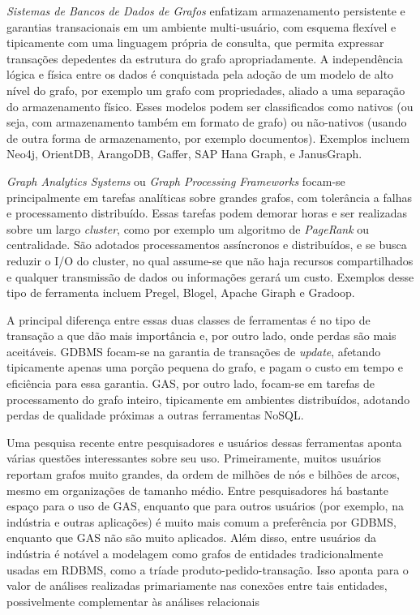 \documentclass[conference]{IEEEtran}
\begin{document}
\emph{Sistemas de Bancos de Dados de Grafos} enfatizam armazenamento
persistente e garantias transacionais em um ambiente multi-usuário, com esquema
flexível e tipicamente com uma linguagem própria de consulta, que permita
expressar transações depedentes da estrutura do grafo apropriadamente. A
independência lógica e física entre os dados é conquistada pela adoção de um
modelo de alto nível do grafo, por exemplo um grafo com propriedades, aliado a
uma separação do armazenamento físico. Esses modelos podem ser classificados
como nativos (ou seja, com armazenamento também em formato de grafo) ou
não-nativos (usando de outra forma de armazenamento, por exemplo documentos).
Exemplos incluem Neo4j, OrientDB, ArangoDB, Gaffer, SAP Hana Graph, e JanusGraph.

\emph{Graph Analytics Systems} ou \emph{Graph Processing Frameworks} focam-se
principalmente em tarefas analíticas sobre grandes grafos, com tolerância a
falhas e processamento distribuído. Essas tarefas podem demorar horas e ser
realizadas sobre um largo \emph{cluster}, como por exemplo um algoritmo de
\emph{PageRank} ou centralidade. São adotados processamentos assíncronos e
distribuídos, e se busca reduzir o I/O do cluster, no qual assume-se que não
haja recursos compartilhados e qualquer transmissão de dados ou informações
gerará um custo. Exemplos desse tipo de ferramenta incluem Pregel, Blogel,
Apache Giraph e Gradoop.

A principal diferença entre essas duas classes de ferramentas é no tipo de
transação a que dão mais importância e, por outro lado, onde perdas são mais
aceitáveis. GDBMS focam-se na garantia de transações de \emph{update}, afetando
tipicamente apenas uma porção pequena do grafo, e pagam o custo em tempo e
eficiência para essa garantia. GAS, por outro lado, focam-se em tarefas de
processamento do grafo inteiro, tipicamente em ambientes distribuídos, adotando
perdas de qualidade próximas a outras ferramentas NoSQL.

Uma pesquisa recente entre pesquisadores e usuários dessas ferramentas
\cite{sahu} aponta várias questões interessantes sobre seu uso. Primeiramente,
muitos usuários reportam grafos muito grandes, da ordem de milhões de nós e
bilhões de arcos, mesmo em organizações de tamanho médio. Entre pesquisadores
há bastante espaço para o uso de GAS, enquanto que para outros usuários
(por exemplo, na indústria e outras aplicações) é muito mais comum a
preferência por GDBMS, enquanto que GAS não são muito aplicados. Além disso,
entre usuários da indústria é notável a modelagem como grafos de entidades
tradicionalmente usadas em RDBMS, como a tríade
{\ttfamily produto-pedido-transação}. Isso aponta para o valor de análises
realizadas primariamente nas conexões entre tais entidades, possivelmente
complementar às análises relacionais
\end{document}
